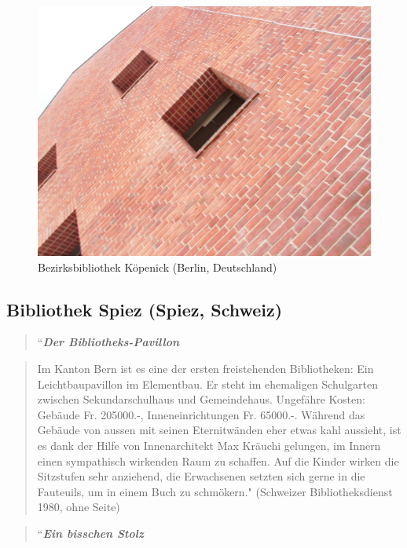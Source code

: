 \documentclass[a4paper,
fontsize=11pt,
oneside,
numbers=noperiodatend,
parskip=half-,
bibliography=totoc,
final
]{scrartcl}
\begin{document}
\begin{figure}[htbp]
\centering
\includegraphics{./img/058.jpg}
\caption{Bezirksbibliothek Köpenick (Berlin,
Deutschland)}
\end{figure}

\subsection*{Bibliothek Spiez (Spiez,
Schweiz)}\label{bibliothek-spiez-spiez-schweiz}

\begin{quote}
``\textbf{\emph{Der Bibliotheks-Pavillon}}
\end{quote}

\begin{quote}
Im Kanton Bern ist es eine der ersten freistehenden Bibliotheken: Ein
Leichtbaupavillon im Elementbau. Er steht im ehemaligen Schulgarten
zwischen Sekundarschulhaus und Gemeindehaus. Ungefähre Kosten: Gebäude
Fr. 205000.-, Inneneinrichtungen Fr. 65000.-. Während das Gebäude von
aussen mit seinen Eternitwänden eher etwas kahl aussieht, ist es dank
der Hilfe von Innenarchitekt Max Kräuchi gelungen, im Innern einen
sympathisch wirkenden Raum zu schaffen. Auf die Kinder wirken die
Sitzstufen sehr anziehend, die Erwachsenen setzten sich gerne in die
Fauteuils, um in einem Buch zu schmökern." (Schweizer Bibliotheksdienst
1980, ohne Seite)
\end{quote}

\begin{quote}
``\textbf{\emph{Ein bisschen Stolz}}
\end{quote}
\end{document}
